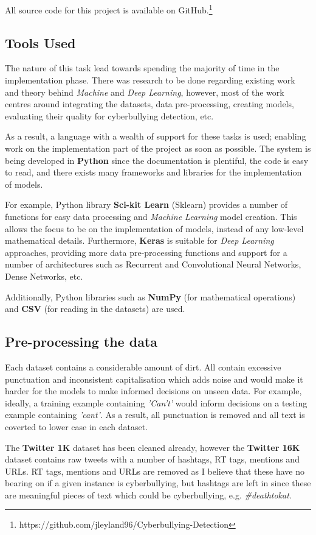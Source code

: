 \documentclass[12pt,a4paper]{article}
\begin{document}
All source code for this project is available on GitHub.\footnote{https://github.com/jleyland96/Cyberbullying-Detection}

\subsection{Tools Used}
The nature of this task lead towards spending the majority of time in the implementation phase. There was research to be done regarding existing work and theory behind \textit{Machine} and \textit{Deep Learning}, however, most of the work centres around integrating the datasets, data pre-processing, creating models, evaluating their quality for cyberbullying detection, etc. 

As a result, a language with a wealth of support for these tasks is used; enabling work on the implementation part of the project as soon as possible. The system is being developed in \textbf{Python} since the documentation is plentiful, the code is easy to read, and there exists many frameworks and libraries for the implementation of models.

For example, Python library \textbf{Sci-kit Learn} (Sklearn) provides a number of functions for easy data processing and \textit{Machine Learning} model creation. This allows the focus to be on the implementation of models, instead of any low-level mathematical details. Furthermore, \textbf{Keras} is suitable for \textit{Deep Learning} approaches, providing more data pre-processing functions and support for a number of architectures such as Recurrent and Convolutional Neural Networks, Dense Networks, etc. 

Additionally, Python libraries such as \textbf{NumPy} (for mathematical operations) and \textbf{CSV} (for reading in the datasets) are used.

\subsection{Pre-processing the data}
Each dataset contains a considerable amount of dirt. All contain excessive punctuation and inconsistent capitalisation which adds noise and would make it harder for the models to make informed decisions on unseen data. For example, ideally, a training example containing \textit{'Can't'} would inform decisions on a testing example containing \textit{'cant'}. As a result, all punctuation is removed and all text is coverted to lower case in each dataset. 

The \textbf{Twitter 1K} dataset has been cleaned already, however the \textbf{Twitter 16K} dataset contains raw tweets with a number of hashtags, RT tags, mentions and URLs. RT tags, mentions and URLs are removed as I believe that these have no bearing on if a given instance is cyberbullying, but hashtags are left in since these are meaningful pieces of text which could be cyberbullying, e.g. \textit{\#deathtokat}.
\end{document}

